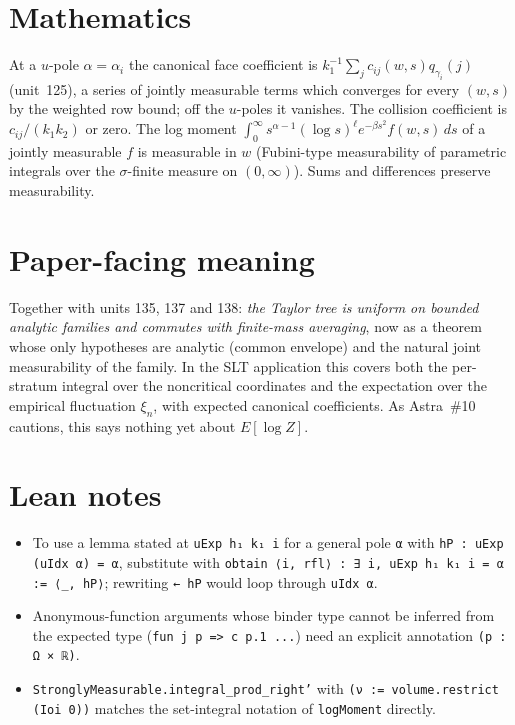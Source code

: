 \documentclass[11pt]{article}
\begin{document}
\section{Mathematics}

At a $u$-pole $\alpha=\alpha_i$ the canonical face coefficient is $k_1^{-1}\sum_jc_{ij}(w,s)q_{\gamma_i}(j)$
(unit~125), a series of jointly measurable terms which converges for every $(w,s)$ by the weighted
row bound; off the $u$-poles it vanishes. The collision coefficient is $c_{ij}/(k_1k_2)$ or zero. The
log moment $\int_0^\infty s^{\alpha-1}(\log s)^\ell e^{-\beta s^2}f(w,s)\,ds$ of a jointly
measurable $f$ is measurable in $w$ (Fubini-type measurability of parametric integrals over the
$\sigma$-finite measure on $(0,\infty)$). Sums and differences preserve measurability.

\section{Paper-facing meaning}

Together with units 135, 137 and 138: \emph{the Taylor tree is uniform on bounded analytic families
and commutes with finite-mass averaging}, now as a theorem whose only hypotheses are analytic
(common envelope) and the natural joint measurability of the family. In the SLT application this
covers both the per-stratum integral over the noncritical coordinates and the expectation over the
empirical fluctuation $\xi_n$, with expected canonical coefficients. As Astra~\#10 cautions, this
says nothing yet about $E[\log Z]$.

\section{Lean notes}

\begin{itemize}
\item To use a lemma stated at \texttt{uExp h₁ k₁ i} for a general pole \texttt{α} with
\texttt{hP : uExp (uIdx α) = α}, substitute with \texttt{obtain ⟨i, rfl⟩ : ∃ i, uExp h₁ k₁ i = α
:= ⟨\_, hP⟩}; rewriting \texttt{← hP} would loop through \texttt{uIdx α}.
\item Anonymous-function arguments whose binder type cannot be inferred from the expected type
(\texttt{fun j p => c p.1 ...}) need an explicit annotation \texttt{(p : Ω × ℝ)}.
\item \texttt{StronglyMeasurable.integral\_prod\_right'} with \texttt{(ν := volume.restrict (Ioi
0))} matches the set-integral notation of \texttt{logMoment} directly.
\end{itemize}
\end{document}
